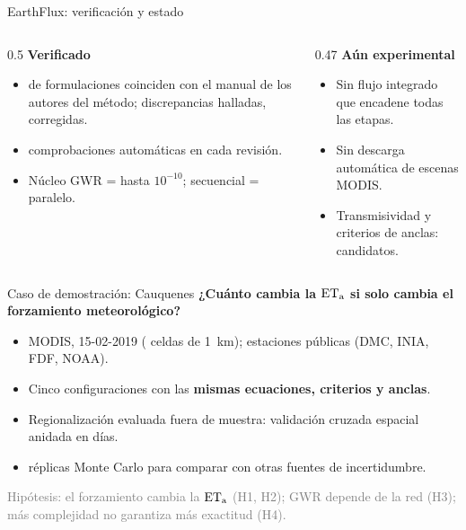 \begin{frame}{EarthFlux: verificación y estado}
\begin{columns}[T]
\begin{column}{0.5\textwidth}
\textbf{Verificado}
\begin{itemize}
  \item \VerVerified{} de \VerRows{} formulaciones coinciden con el manual de los autores del método; \VerDiscrepancies{} discrepancias halladas, \VerFixed{} corregidas.
  \item \NExpectations{} comprobaciones automáticas en cada revisión.
  \item Núcleo GWR =  hasta $10^{-10}$; secuencial = paralelo.
\end{itemize}
\end{column}
\begin{column}{0.47\textwidth}
\textbf{Aún experimental}
\begin{itemize}
  \item Sin flujo integrado que encadene todas las etapas.
  \item Sin descarga automática de escenas MODIS.
  \item Transmisividad y criterios de anclas: candidatos.
\end{itemize}
\end{column}
\end{columns}
\end{frame}

\begin{frame}{Caso de demostración: Cauquenes}
\textbf{¿Cuánto cambia la $\mathrm{ET_a}$ si solo cambia el forzamiento meteorológico?}
\vspace{2mm}
\begin{itemize}
  \item MODIS, 15-02-2019 (\SceneCellsValid{} celdas de 1~km); \NStations{} estaciones públicas (DMC, INIA, FDF, NOAA).
  \item Cinco configuraciones con las \textbf{mismas ecuaciones, criterios y anclas}.
  \item Regionalización evaluada fuera de muestra: validación cruzada espacial anidada en \NCVDays{} días.
  \item \NMC{} réplicas Monte Carlo para comparar con otras fuentes de incertidumbre.
\end{itemize}
\vspace{2mm}
\textcolor{gray}{Hipótesis: el forzamiento cambia la $\mathrm{ET_a}$ (H1, H2); GWR depende de la red (H3); más complejidad no garantiza más exactitud (H4).}
\end{frame}

